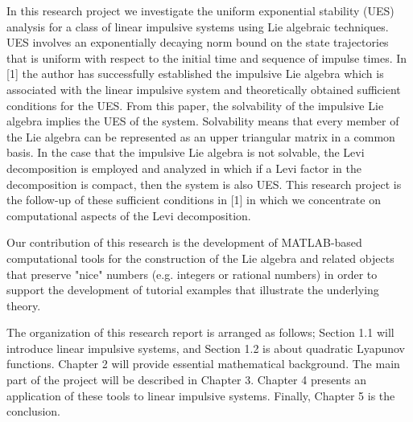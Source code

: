 \documentclass[11pt,a4paper]{article}
\begin{document}
In this research project we investigate the uniform exponential stability (UES) analysis for a class of linear impulsive systems using Lie algebraic techniques. UES involves an exponentially decaying norm bound on the state trajectories that is uniform with respect to the initial time and sequence of impulse times. In [1] the author has successfully established the impulsive Lie algebra which is associated with the linear impulsive system and theoretically obtained sufficient conditions for the UES. From this paper, the solvability of the impulsive Lie algebra implies the UES of the system. Solvability means that every member of the Lie algebra can be represented as an upper triangular matrix in a common basis. In the case that the impulsive Lie algebra is not solvable, the Levi decomposition is employed and analyzed in which if a Levi factor in the decomposition is compact, then the system is also UES. This research project is the follow-up of these sufficient conditions in [1] in which we concentrate on computational aspects of the Levi decomposition.

Our contribution of this research is the development of MATLAB-based computational tools for the construction of the Lie algebra and related objects that preserve "nice" numbers (e.g. integers or rational numbers) in order to support the development of tutorial examples that illustrate the underlying theory.

The organization of this research report is arranged as follows; Section 1.1 will introduce linear impulsive systems, and Section 1.2 is about quadratic Lyapunov functions. Chapter 2 will provide essential mathematical background. The main part of the project will be described in Chapter 3. Chapter 4 presents an application of these tools to linear impulsive systems. Finally, Chapter 5 is the conclusion.

% 
\end{document}
